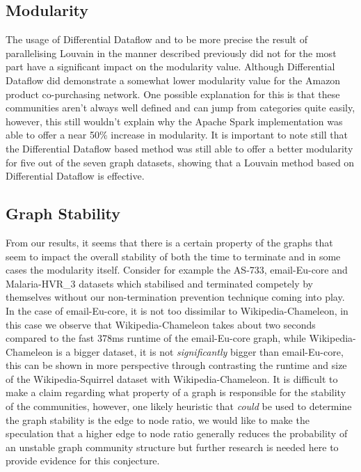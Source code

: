 \subsection{Modularity}
The usage of Differential Dataflow and to be more precise the result of parallelising Louvain in the manner described previously did not for the most part have a significant impact on the modularity value. Although Differential Dataflow did demonstrate a somewhat lower modularity value for the Amazon product co-purchasing network. One possible explanation for this is that these communities aren't always well defined and can jump from categories quite easily, however, this still wouldn't explain why the Apache Spark implementation was able to offer a near 50\% increase in modularity. It is important to note still that the Differential Dataflow based method was still able to offer a better modularity for five out of the seven graph datasets, showing that a Louvain method based on Differential Dataflow is effective. 

\subsection{Graph Stability}
\label{section:graph_stability}
From our results, it seems that there is a certain property of the graphs that seem to impact the overall stability of both the time to terminate and in some cases the modularity itself. Consider for example the AS-733, email-Eu-core and Malaria-HVR\_3 datasets which stabilised and terminated competely by themselves without our non-termination prevention technique coming into play. In the case of email-Eu-core, it is not too dissimilar to Wikipedia-Chameleon, in this case we observe that Wikipedia-Chameleon takes about two seconds compared to the fast 378ms runtime of the email-Eu-core graph, while Wikipedia-Chameleon is a bigger dataset, it is not \textit{significantly} bigger than email-Eu-core, this can be shown in more perspective through contrasting the runtime and size of the Wikipedia-Squirrel dataset with Wikipedia-Chameleon. It is difficult to make a claim regarding what property of a graph is responsible for the stability of the communities, however, one likely heuristic that \textit{could} be used to determine the graph stability is the edge to node ratio, we would like to make the speculation that a higher edge to node ratio generally reduces the probability of an unstable graph community structure but further research is needed here to provide evidence for this conjecture. 

